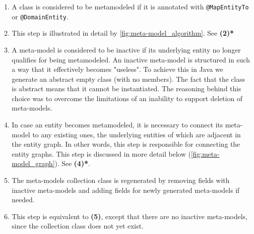 \begin{enumerate}[label={\textbf{(\arabic*)}}]
    \item A class is considered to be metamodeled if it is annotated with \texttt{@MapEntityTo} or \texttt{@DomainEntity}.
    \item This step is illustrated in detail by \ref{fig:meta-model_algorithm}. See \textbf{(2)*}
    \item A meta-model is considered to be inactive if its underlying entity no longer qualifies for being metamodeled. An inactive meta-model is structured in such a way that it effectively becomes "useless". To achieve this in Java we generate an abstract empty class (with no members). The fact that the class is abstract means that it cannot be instantiated. The reasoning behind this choice was to overcome the limitations of an inability to support deletion of meta-models.
    \item In case an entity becomes metamodeled, it is necessary to connect its meta-model to any existing ones, the underlying entities of which are adjacent in the entity graph. In other words, this step is responsible for connecting the entity graphs. This step is discussed in more detail below (\ref{fig:meta-model_graph}). See \textbf{(4)*}.
    \item The meta-models collection class is regenerated by removing fields with inactive meta-models and adding fields for newly generated meta-models if needed.
    \item This step is equivalent to \textbf{(5)}, except that there are no inactive meta-models, since the collection class does not yet exist.
\end{enumerate}

